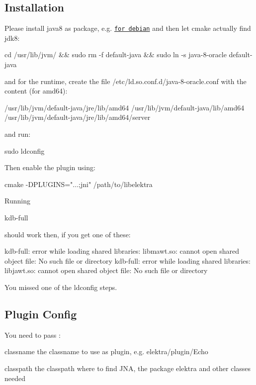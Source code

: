 \subsection*{Installation}

Please install java8 as package, e.\+g. \href{http://www.webupd8.org/2014/03/how-to-install-oracle-java-8-in-debian.html}{\tt for debian} and then let cmake actually find jdk8\+: \begin{DoxyVerb}cd /usr/lib/jvm/ && sudo rm -f default-java && sudo ln -s java-8-oracle default-java
\end{DoxyVerb}


and for the runtime, create the file {\ttfamily /etc/ld.so.\+conf.\+d/java-\/8-\/oracle.conf} with the content (for amd64)\+: \begin{DoxyVerb}/usr/lib/jvm/default-java/jre/lib/amd64
/usr/lib/jvm/default-java/lib/amd64
/usr/lib/jvm/default-java/jre/lib/amd64/server
\end{DoxyVerb}


and run\+: \begin{DoxyVerb}sudo ldconfig
\end{DoxyVerb}


Then enable the plugin using\+: \begin{DoxyVerb}cmake -DPLUGINS="...;jni" /path/to/libelektra
\end{DoxyVerb}


Running \begin{DoxyVerb}kdb-full
\end{DoxyVerb}


should work then, if you get one of these\+: \begin{DoxyVerb}kdb-full: error while loading shared libraries: libmawt.so: cannot open shared object file: No such file or directory
kdb-full: error while loading shared libraries: libjawt.so: cannot open shared object file: No such file or directory
\end{DoxyVerb}


You missed one of the ldconfig steps.

\subsection*{Plugin Config}

You need to pass \+:
\begin{DoxyItemize}
\item classname the classname to use as plugin, e.\+g. elektra/plugin/\+Echo
\item classpath the classpath where to find J\+N\+A, the package elektra and other classes needed
\end{DoxyItemize}

